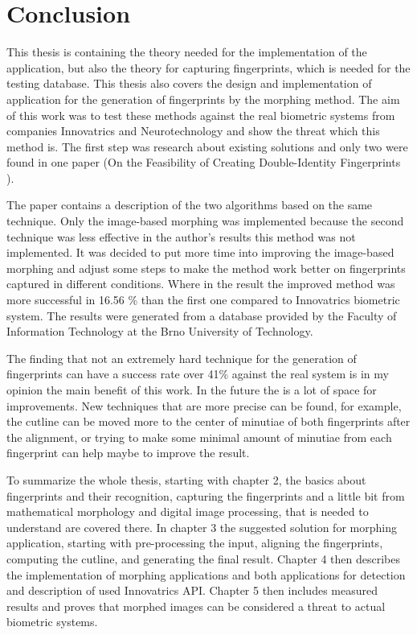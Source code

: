 \chapter{Conclusion}
This thesis is containing the theory needed for the implementation of the application, but also the theory for capturing fingerprints, which is needed for the testing database. This thesis also covers the design and implementation of application for the generation of fingerprints by the morphing method. The aim of this work was to test these methods against the real biometric systems from companies Innovatrics and Neurotechnology and show the threat which this method is. The first step was research about existing solutions and only two were found in one paper (On the Feasibility of Creating Double-Identity Fingerprints \cite{morphing_paper}). 

The paper contains a description of the two algorithms based on the same technique. Only the image-based morphing was implemented because the second technique was less effective in the author’s results this method was not implemented. It was decided to put more time into improving the image-based morphing and adjust some steps to make the method work better on fingerprints captured in different conditions. Where in the result the improved method was more successful in 16.56 \% than the first one compared to Innovatrics biometric system. The results were generated from a database provided by the Faculty of Information Technology at the Brno University of Technology. 

The finding that not an extremely hard technique for the generation of fingerprints can have a success rate over 41\% against the real system is in my opinion the main benefit of this work. In the future the is a lot of space for improvements. New techniques that are more precise can be found, for example, the cutline can be moved more to the center of minutiae of both fingerprints after the alignment, or trying to make some minimal amount of minutiae from each fingerprint can help maybe to improve the result.

To summarize the whole thesis, starting with chapter 2, the basics about fingerprints and their recognition, capturing the fingerprints and a little bit from mathematical morphology and digital image processing, that is needed to understand are covered there. In chapter 3 the suggested solution for morphing application, starting with pre-processing the input, aligning the fingerprints, computing the cutline, and generating the final result. Chapter 4 then describes the implementation of morphing applications and both applications for detection and description of used Innovatrics API. Chapter 5 then includes measured results and proves that morphed images can be considered a threat to actual biometric systems.
